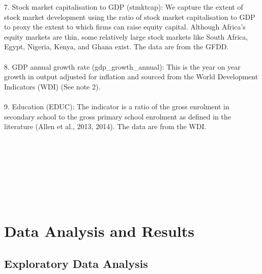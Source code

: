 \documentclass[a4paper, nobind]{templates/ociamthesis}
\begin{document}
\begin{table}
\begin{tabu}
7. Stock market capitalisation to GDP (stmktcap): We capture the  extent of stock market development using the ratio of stock market capitalisation to GDP to proxy the extent to which firms can raise equity capital. Although Africa's equity markets are thin, some relatively large stock markets like South Africa, Egypt, Nigeria, Kenya, and Ghana exist. The data are from the GFDD.\\
\\
8. GDP annual growth rate (gdp\_growth\_annual): This is the year on year growth in output adjusted for inflation and sourced from the World Development Indicators (WDI) (See note 2).\\
\addlinespace
\\
9. Education (EDUC): The indicator is a ratio of the gross enrolment in secondary school to the gross primary school enrolment as defined in the literature (Allen et al., 2013, 2014). The data are from the WDI.\\
\\
\bottomrule
{}\\
\\
\\
\\
\\
\\
\end{tabu}
\end{table}

\hypertarget{data-analysis-and-results}{%
\section{Data Analysis and Results}\label{data-analysis-and-results}}

\hypertarget{exploratory-data-analysis}{%
\subsection{Exploratory Data Analysis}\label{exploratory-data-analysis}}
\end{document}

